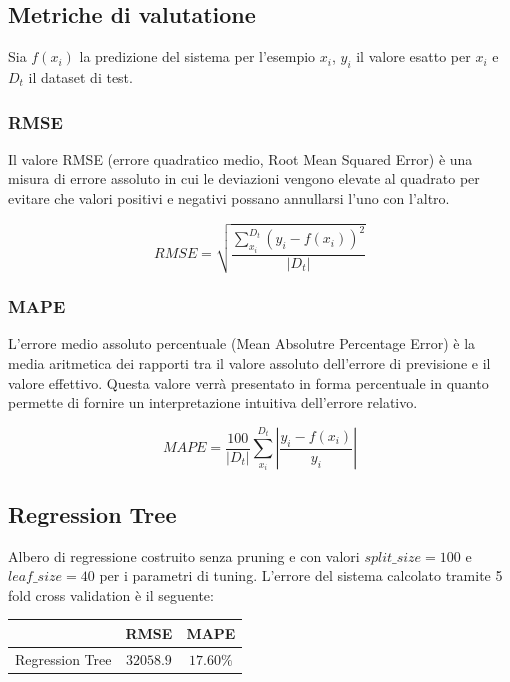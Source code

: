 \documentclass{article}
\begin{document}
    \subsection{Metriche di valutatione}
    Sia $f(x_i)$ la predizione del sistema per l'esempio $x_i$, $y_i$ il valore
    esatto per $x_i$ e $D_t$ il dataset di test.
    \subsubsection{RMSE}
    Il valore RMSE (errore quadratico medio, Root Mean Squared Error) è una misura
    di errore assoluto in cui le deviazioni vengono elevate al quadrato per evitare che 
    valori positivi e negativi possano annullarsi l'uno con l'altro. 
   
    
    \[
      RMSE = \sqrt{ \frac{\sum_{x_i}^{D_t}(y_i - f(x_i))^2}{|D_t|}}
    \]
    \subsubsection{MAPE}
    L'errore medio assoluto percentuale (Mean Absolutre Percentage Error) è la media aritmetica dei rapporti 
    tra il valore assoluto dell'errore di previsione e il valore effettivo. Questa valore 
    verrà presentato in forma percentuale in quanto permette di fornire un interpretazione
    intuitiva dell'errore relativo.

    \[
        MAPE =  \frac{100}{|D_t|}   \sum_{x_i}^{D_t}\left|\frac{y_i - f(x_i)}{y_i}\right|
    \]

    \subsection{Regression Tree}
    Albero di regressione costruito senza pruning e con valori
    $\textit{split\_size}=100$ e $\textit{leaf\_size}=40$ per i parametri di tuning.
    L'errore del sistema calcolato tramite 5 fold cross validation è il seguente:
    
    \begin{center}
        \begin{tabular}{|c|c|c|}
            \hline
             & \textbf{RMSE} & \textbf{MAPE} \\
            \hline
            Regression Tree & $32058.9$ &  $17.60\%$ \\
            \hline
        \end{tabular}
    \end{center}
    
\end{document}

